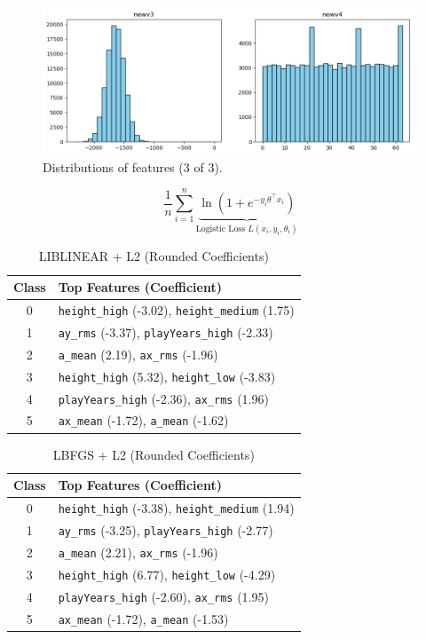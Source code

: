 \documentclass[10pt,twocolumn]{article}
\begin{document}
\begin{figure}[H]
    \centering
    \includegraphics[width=0.85\linewidth]{images/distribution_3.png}
    \caption{Distributions of features (3 of 3).}
    \label{fig:distribution-3}
\end{figure}

\begin{equation}{\dfrac 1 n} \sum^n_{i=1}  \underbrace{\ln ({1+e^{-y_i \theta^\top x_i}})}_{\text{Logistic Loss \ } L(x_i, y_i, \theta_i)}\label{eq:logistic-loss}
\end{equation}

\begin{table}[H]
\centering
\footnotesize
\caption{LIBLINEAR + L2 (Rounded Coefficients)}
\begin{tabular}{|c|p{6.5cm}|}
\hline
\textbf{Class} & \textbf{Top Features (Coefficient)} \\
\hline
0 & \texttt{height\_high} (-3.02), \texttt{height\_medium} (1.75) \\
1 & \texttt{ay\_rms} (-3.37), \texttt{playYears\_high} (-2.33) \\
2 & \texttt{a\_mean} (2.19), \texttt{ax\_rms} (-1.96) \\
3 & \texttt{height\_high} (5.32), \texttt{height\_low} (-3.83) \\
4 & \texttt{playYears\_high} (-2.36), \texttt{ax\_rms} (1.96) \\
5 & \texttt{ax\_mean} (-1.72), \texttt{a\_mean} (-1.62) \\
\hline
\end{tabular}
\label{tab:logreg-liblinear-l2}
\end{table}

\begin{table}[H]
\centering
\footnotesize
\caption{LBFGS + L2 (Rounded Coefficients)}
\begin{tabular}{|c|p{6.5cm}|}
\hline
\textbf{Class} & \textbf{Top Features (Coefficient)} \\
\hline
0 & \texttt{height\_high} (-3.38), \texttt{height\_medium} (1.94) \\
1 & \texttt{ay\_rms} (-3.25), \texttt{playYears\_high} (-2.77) \\
2 & \texttt{a\_mean} (2.21), \texttt{ax\_rms} (-1.96) \\
3 & \texttt{height\_high} (6.77), \texttt{height\_low} (-4.29) \\
4 & \texttt{playYears\_high} (-2.60), \texttt{ax\_rms} (1.95) \\
5 & \texttt{ax\_mean} (-1.72), \texttt{a\_mean} (-1.53) \\
\hline
\end{tabular}
\label{tab:logreg-lbfgs-l2}
\end{table}
\end{document}
